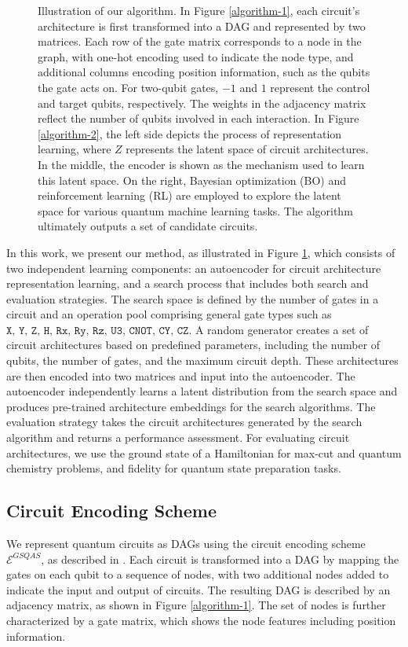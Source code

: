 \documentclass{article} %
\begin{document}
\begin{figure}[ht]
\begin{center}
    \caption{Illustration of our algorithm. In Figure \ref{algorithm-1}, each circuit's architecture is first transformed into a DAG and represented by two matrices. Each row of the gate matrix corresponds to a node in the graph, with one-hot encoding used to indicate the node type, and additional columns encoding position information, such as the qubits the gate acts on. For two-qubit gates, $-1$ and $1$ represent the control and target qubits, respectively. The weights in the adjacency matrix reflect the number of qubits involved in each interaction. In Figure \ref{algorithm-2}, the left side depicts the process of representation learning, where $Z$ represents the latent space of circuit architectures. In the middle, the encoder is shown as the mechanism used to learn this latent space. On the right, Bayesian optimization (BO) and reinforcement learning (RL) are employed to explore the latent space for various quantum machine learning tasks. The algorithm ultimately outputs a set of candidate circuits.}
    \label{algorithm} 
\end{center}
\end{figure}
In this work, we present our method, as illustrated in Figure \ref{algorithm}, which consists of two independent learning components: an autoencoder for circuit architecture representation learning, and a search process that includes both search and evaluation strategies. The search space is defined by the number of gates in a circuit and an operation pool comprising general gate types such as ${\texttt{X, Y, Z, H, Rx, Ry, Rz, U3, CNOT, CY, CZ}}$. A random generator creates a set of circuit architectures based on predefined parameters, including the number of qubits, the number of gates, and the maximum circuit depth. These architectures are then encoded into two matrices and input into the autoencoder. The autoencoder independently learns a latent distribution from the search space and produces pre-trained architecture embeddings for the search algorithms. The evaluation strategy takes the circuit architectures generated by the search algorithm and returns a performance assessment. For evaluating circuit architectures, we use the ground state of a Hamiltonian for max-cut and quantum chemistry problems, and fidelity for quantum state preparation tasks.
\subsection{Circuit Encoding Scheme}
We represent quantum circuits as DAGs using the circuit encoding scheme $\mathcal{E}^{GSQAS}$, as described in \citet{he2023gnn, he2023gsqas}. Each circuit is transformed into a DAG by mapping the gates on each qubit to a sequence of nodes, with two additional nodes added to indicate the input and output of circuits. The resulting DAG is described by an adjacency matrix, as shown in Figure \ref{algorithm-1}. The set of nodes is further characterized by a gate matrix, which shows the node features including position information. 
\end{document}
